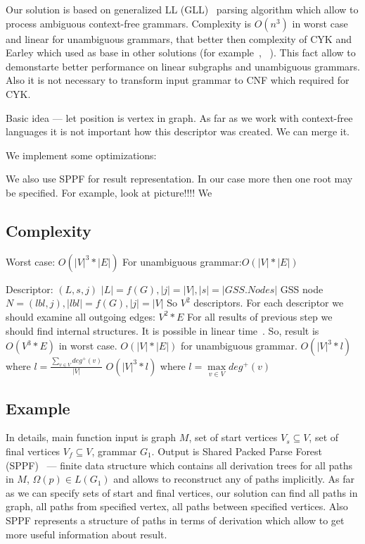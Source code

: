 \documentclass{sig-alternate} %
\begin{document}
Our solution is based on generalized LL (GLL)~\cite{scott2010gll, FastPracticalGLL} parsing algorithm which allow to process ambiguous context-free grammars.
Complexity is $O(n^3)$ in worst case and linear for unambiguous grammars, that better then complexity of CYK and Earley which used as base in other solutions (for example~\cite{ConjCFPathQuery}, ~\cite{GraphQueryWithEarley}).
This fact allow to demonstarte better performance on linear subgraphs and unambiguous grammars.
Also it is not necessary to transform input grammar to CNF which required for CYK.

Basic idea --- let position is vertex in graph. As far as we work with context-free languages it is not important how this descriptor was created. We can merge it. 

We implement some optimizations:~\cite{FastPracticalGLL}

We also use SPPF for result representation.
In our case more then one root may be specified. For example, look at picture!!!! We 

\subsection{Complexity}

Worst case: $O(|V|^3*|E|)$ For unambiguous grammar:$O(|V|*|E|)$


Descriptor: $(L, s, j)$ $|L| = f(G), |j| = |V|, |s| = |GSS.Nodes|$
GSS node $N = (lbl, j), |lbl| = f(G), |j| = |V|$
So $V^2$ descriptors.
For each descriptor we should examine all outgoing edges: $V^2*E$
For all results of previous step we should find internal structures. It is possible in linear time~\cite{modellingGLL}.
So, result is $O(V^3*E)$ in worst case.
$O(|V|*|E|)$ for unambiguous grammar.
$O(|V|^3*l)$ where $l = \frac {\sum\limits_{v \in V} deg^+(v)}{|V|}$
$O(|V|^3*l)$ where $l = \max\limits_{v \in V} deg^+(v)$




\subsection{Example}
In details, main function input is graph $M$, set of start vertices $V_s\subseteq V$, set of final vertices $V_f\subseteq V$, grammar $G_1$.
Output is Shared Packed Parse Forest (SPPF)~\cite{SPPF} --- finite data structure which contains all derivation trees for all paths in $M$, $\Omega(p) \in L(G_1)$ and allows to reconstruct any of paths implicitly.
As far as we can specify sets of start and final vertices, our solution can find all paths in graph, all paths from specified vertex, all paths between specified vertices. 
Also SPPF represents a structure of paths in terms of derivation which allow to get more useful information about result.
\end{document}
